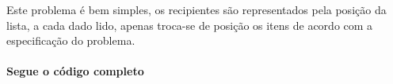 \par Este problema é bem simples, os recipientes são representados pela posição da lista, a cada dado lido, apenas troca-se de posição os itens de acordo com a especificação do problema.
\paragraph{Segue o código completo}
\begin{mdframed}[linewidth=0pt,backgroundcolor=codebgcolor]
    \inputminted[breaklines]{python}{../src/trik/trik.py}
\end{mdframed}